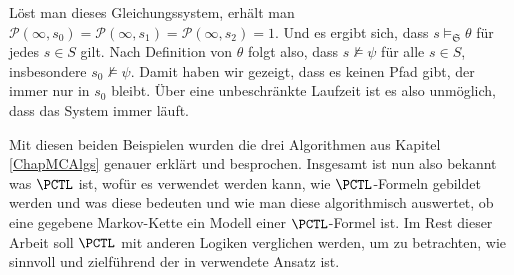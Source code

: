 Löst man dieses Gleichungssystem, erhält man $\mathcal{P}(\infty, s_0)=\mathcal{P}(\infty, s_1)=\mathcal{P}(\infty, s_2)=1$.
Und es ergibt sich, dass $s\models_\mathfrak{S} \theta$ für jedes $s\in S$ gilt.
Nach Definition von $\theta$ folgt also, dass $s\not\models \psi$ für alle $s\in S$, insbesondere $s_0\not\models \psi$.
Damit haben wir gezeigt, dass es keinen Pfad gibt, der immer nur in $s_0$ bleibt. 
Über eine unbeschränkte Laufzeit ist es also unmöglich, dass das System immer läuft.

Mit diesen beiden Beispielen wurden die drei Algorithmen aus Kapitel \ref{ChapMCAlgs} genauer erklärt und besprochen. 
Insgesamt ist nun also bekannt was $\PCTL$ ist, wofür es verwendet werden kann, wie $\PCTL$-Formeln gebildet werden und was diese bedeuten und wie man diese algorithmisch auswertet, ob eine gegebene Markov-Kette ein Modell einer $\PCTL$-Formel ist. 
Im Rest dieser Arbeit soll $\PCTL$ mit anderen Logiken verglichen werden, um zu betrachten, wie sinnvoll und zielführend der in \cite{hansson1994logic} verwendete Ansatz ist.